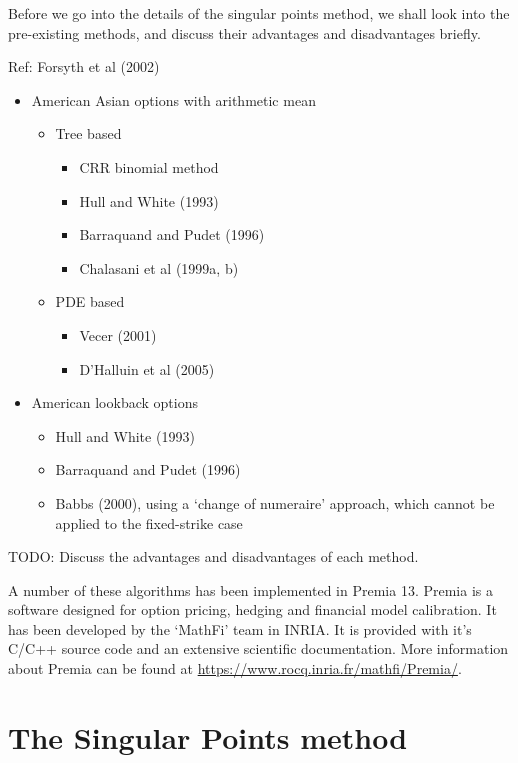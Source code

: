 Before we go into the details of the singular points method, we shall look into the pre-existing methods, and discuss their advantages and disadvantages briefly.

Ref: Forsyth et al (2002)

\begin{itemize}
\item American Asian options with arithmetic mean
	\begin{itemize}
	\item Tree based
		\begin{itemize}
		\item CRR binomial method
		\item Hull and White (1993)
		\item Barraquand and Pudet (1996)
		\item Chalasani et al (1999a, b)
		\end{itemize}
	\item PDE based
		\begin{itemize}
		\item Vecer (2001)
		\item D’Halluin et al (2005)
		\end{itemize}
	\end{itemize}
\item American lookback options
	\begin{itemize}
	\item Hull and White (1993)
	\item Barraquand and Pudet (1996)
	\item Babbs (2000), using a `change of numeraire' approach, which cannot be applied to the fixed-strike case
	\end{itemize}
\end{itemize}

TODO: Discuss the advantages and disadvantages of each method.

A number of these algorithms has been implemented in Premia 13. Premia is a software designed for option pricing, hedging and financial model calibration. It has been developed by the `MathFi' team in INRIA. It is provided with it's C/C++ source code and an extensive scientific documentation. More information about Premia can be found at \url{https://www.rocq.inria.fr/mathfi/Premia/}.



\section{The Singular Points method}
\label{sec:sp-asian-method}

